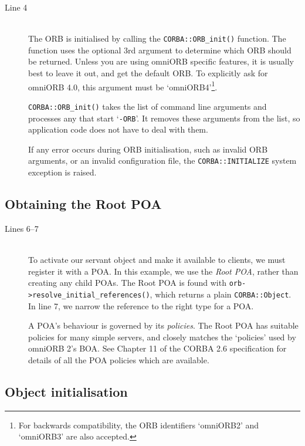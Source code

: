 \documentclass[11pt,twoside,a4paper]{book}
\newcommand{\type}[1]{\texttt{#1}}
\newcommand{\code}[1]{\texttt{#1}}
\newcommand{\op}[1]{\texttt{#1()}}
\newcommand{\term}[1]{\textit{#1}}
\newcommand{\dsc}{\discretionary{}{}{}}
\begin{document}
\begin{description}

\item[Line 4]\mbox{}\\
%
The ORB is initialised by calling the \op{CORBA::ORB\_init}
function. The function uses the optional 3rd argument to determine
which ORB should be returned. Unless you are using omniORB specific
features, it is usually best to leave it out, and get the default
ORB. To explicitly ask for omniORB 4.0, this argument must be
`omniORB4'\footnote{For backwards compatibility, the ORB identifiers
`omniORB2' and `omniORB3' are also accepted.}.

\op{CORBA::ORB\_init} takes the list of command line arguments and
processes any that start `\code{-ORB}'. It removes these arguments
from the list, so application code does not have to deal with them.

If any error occurs during ORB initialisation, such as invalid ORB
arguments, or an invalid configuration file, the
\code{CORBA::INITIALIZE} system exception is raised.

\end{description}


\subsection{Obtaining the Root POA}

\begin{description}

\item[Lines 6--7]\mbox{}\\
%
To activate our servant object and make it available to clients, we
must register it with a POA. In this example, we use the \term{Root
POA}, rather than creating any child POAs. The Root POA is found with
\op{orb->resolve\_initial\_\dsc{}references}, which returns a plain
\type{CORBA::Object}. In line 7, we narrow the reference to the right
type for a POA.

A POA's behaviour is governed by its \term{policies}. The Root POA has
suitable policies for many simple servers, and closely matches the
`policies' used by omniORB 2's BOA. See Chapter 11 of the CORBA 2.6
specification\cite{corba26-spec} for details of all the POA policies
which are available.

\end{description}


\subsection{Object initialisation}
\end{document}
